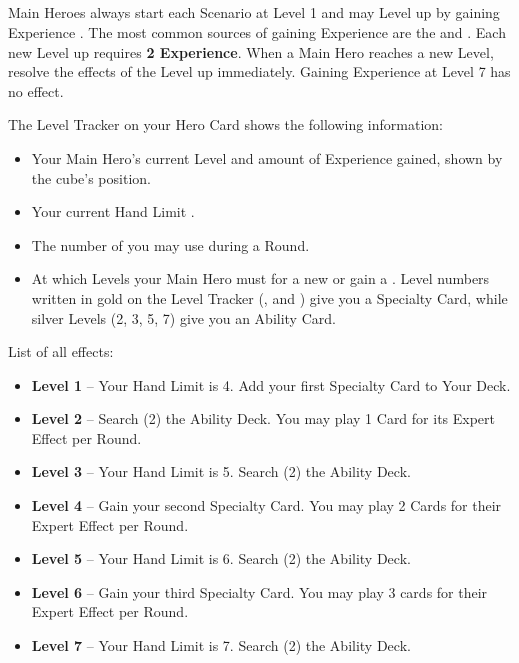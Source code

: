 
\clearpage

\begin{multicols}{2}

\subsection*{}
Main Heroes always start each Scenario at Level 1 and may Level up by gaining Experience .
The most common sources of gaining Experience are the  and .
Each new Level up requires \textbf{2 Experience}.
When a Main Hero reaches a new Level, resolve the effects of the Level up immediately.
Gaining Experience at Level 7 has no effect.\par
The Level Tracker on your Hero Card shows the following information:
\begin{itemize}
\item Your Main Hero's current Level and amount of Experience gained, shown by the cube's position.
\item Your current Hand Limit .
\item The number of   you may use during a Round.
\item At which Levels your Main Hero must  for a new  or gain a .
Level numbers written in gold on the Level Tracker (,  and ) give you a Specialty Card, while silver Levels (2, 3, 5, 7) give you an Ability Card.
\end{itemize}
\vfill\null
\columnbreak
List of all effects:
\begin{itemize}
\item \textbf{Level 1} – Your Hand Limit is 4.
Add your first Specialty Card to Your Deck.
\item \textbf{Level 2} – Search (2) the Ability Deck.
You may play 1 Card for its Expert Effect per Round.
\item \textbf{Level 3} – Your Hand Limit is 5.
Search (2) the Ability Deck.
\item \textbf{Level 4} – Gain your second Specialty Card.
You may play 2 Cards for their Expert Effect per Round.
\item \textbf{Level 5} – Your Hand Limit is 6.
Search (2) the Ability Deck.
\item \textbf{Level 6} – Gain your third Specialty Card.
You may play 3 cards for their Expert Effect per Round.
\item \textbf{Level 7} – Your Hand Limit is 7.
Search (2) the Ability Deck.
\end{itemize}

\end{multicols}

